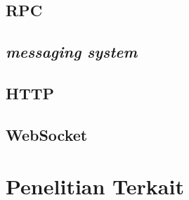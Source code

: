 \subsection{RPC}
\subsection{\textit{messaging system}}
\subsection{HTTP}
\subsection{WebSocket}

\section{Penelitian Terkait}
\blindtext

